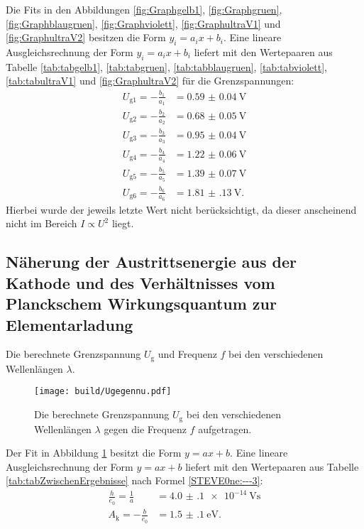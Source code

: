 Die Fits in den Abbildungen \ref{fig:Graphgelb1}, \ref{fig:Graphgruen}, \ref{fig:Graphblaugruen}, \ref{fig:Graphviolett}, \ref{fig:GraphultraV1} und \ref{fig:GraphultraV2} besitzen die Form $y_i=a_i x + b_i$. Eine lineare Ausgleichsrechnung der Form $y_i=a_i x+b_i$ liefert mit den Wertepaaren aus Tabelle \ref{tab:tabgelb1}, \ref{tab:tabgruen}, \ref{tab:tabblaugruen}, \ref{tab:tabviolett}, \ref{tab:tabultraV1} und \ref{fig:GraphultraV2} für die Grenzspannungen:
\begin{align}
	U_{\text{g}1} = -\frac{b_1}{a_1} &= \SI{0.59(4)}{\volt}\\
	U_{\text{g}2} = -\frac{b_2}{a_2} &= \SI{0.68(5)}{\volt}\\
	U_{\text{g}3} = -\frac{b_3}{a_3} &= \SI{0.95(4)}{\volt}\\
	U_{\text{g}4} = -\frac{b_4}{a_4} &= \SI{1.22(6)}{\volt}\\
	U_{\text{g}5} = -\frac{b_5}{a_5} &= \SI{1.39(7)}{\volt}\\
	U_{\text{g}6} = -\frac{b_6}{a_6} &= \SI{1.81(13)}{\volt}\text{.}
\end{align}
Hierbei wurde der jeweils letzte Wert nicht berücksichtigt, da dieser anscheinend nicht im Bereich $I\propto U^2$ liegt.

\subsection{Näherung der Austrittsenergie aus der Kathode und des Verhältnisses vom Planckschem Wirkungsquantum zur Elementarladung}
\begin{table}
	\centering
	\caption{Die berechnete Grenzspannung $U_\text{g}$ und Frequenz $f$ bei den verschiedenen Wellenlängen $\lambda$.}
  	
\end{table}
\begin{figure}
	\centering
	\caption{Die berechnete Grenzspannung $U_\text{g}$ bei den verschiedenen Wellenlängen $\lambda$ gegen die Frequenz $f$ aufgetragen.}
	\texttt{[image: build/Ugegennu.pdf]}
	\label{fig:GraphUgegennu}
\end{figure}
Der Fit in Abbildung \ref{fig:GraphUgegennu} besitzt die Form $y=a x + b$. Eine lineare Ausgleichsrechnung der Form $y=a x + b$ liefert mit den Wertepaaren aus Tabelle \ref{tab:tabZwischenErgebnisse} nach Formel \eqref{STEVE0ne:---3}:
\begin{align}
	\frac{h}{e_0}=\frac{1}{a} &= \SI{4.0(1)e-14}{\volt\second}\\
	A_\text{k}=-\frac{b}{e_0} &= \SI{1.5(1)}{\electronvolt}\text{.}
\end{align}


